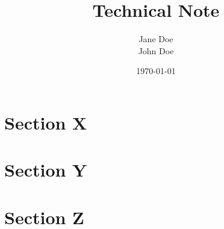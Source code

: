 \documentclass[11pt, a4paper, titlepage]{article}
\title{Technical Note}
\author{
    Jane Doe\\
    John Doe\\
}
\date{\today}
\begin{document}
    


    \section*{Section X}
    \lipsum[2-4]

    \section*{Section Y}
    \lipsum[3-6]

    \section*{Section Z}
    \lipsum[7-8]
\end{document}
